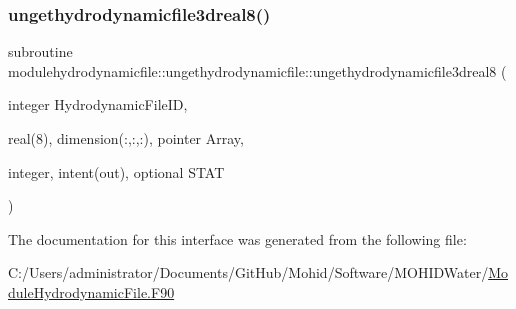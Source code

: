 \mbox{\label{interfacemodulehydrodynamicfile_1_1ungethydrodynamicfile_a6014067558e4b44811e0e61d402f12e0}} 
\subsubsection{\texorpdfstring{ungethydrodynamicfile3dreal8()}{ungethydrodynamicfile3dreal8()}}
{\footnotesize\ttfamily subroutine modulehydrodynamicfile\+::ungethydrodynamicfile\+::ungethydrodynamicfile3dreal8 (\begin{DoxyParamCaption}\item[{integer}]{Hydrodynamic\+File\+ID,  }\item[{real(8), dimension(\+:,\+:,\+:), pointer}]{Array,  }\item[{integer, intent(out), optional}]{S\+T\+AT }\end{DoxyParamCaption})\hspace{0.3cm}{\ttfamily [private]}}



The documentation for this interface was generated from the following file\+:\begin{DoxyCompactItemize}
\item 
C\+:/\+Users/administrator/\+Documents/\+Git\+Hub/\+Mohid/\+Software/\+M\+O\+H\+I\+D\+Water/\mbox{\hyperlink{_module_hydrodynamic_file_8_f90}{Module\+Hydrodynamic\+File.\+F90}}\end{DoxyCompactItemize}
